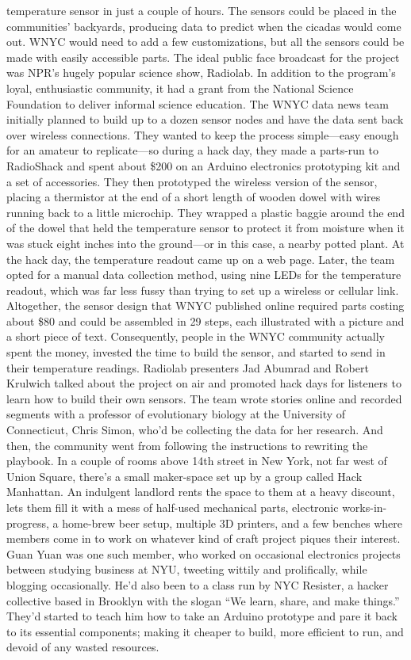temperature sensor in just a couple of hours. The sensors could be placed
in the communities' backyards, producing data to predict when the cicadas
would come out. WNYC would need to add a few customizations, but all
the sensors could be made with easily accessible parts.
The ideal public face broadcast for the project was NPR's hugely popular
science show, Radiolab. In addition to the program's loyal, enthusiastic
community, it had a grant from the National Science Foundation to deliver
informal science education.
The WNYC data news team initially planned to build up to a dozen sensor
nodes and have the data sent back over wireless connections. They wanted
to keep the process simple—easy enough for an amateur to replicate—so
during a hack day, they made a parts-run to RadioShack and spent about
\$200 on an Arduino electronics prototyping kit and a set of accessories.
They then prototyped the wireless version of the sensor, placing a thermistor
at the end of a short length of wooden dowel with wires running back
to a little microchip. They wrapped a plastic baggie around the end of the
dowel that held the temperature sensor to protect it from moisture when
it was stuck eight inches into the ground—or in this case, a nearby potted
plant. At the hack day, the temperature readout came up on a web page.
Later, the team opted for a manual data collection method, using nine LEDs
for the temperature readout, which was far less fussy than trying to set up a
wireless or cellular link.
Altogether, the sensor design that WNYC published online required parts
costing about \$80 and could be assembled in 29 steps, each illustrated with
a picture and a short piece of text. Consequently, people in the WNYC
community actually spent the money, invested the time to build the sensor,
and started to send in their temperature readings. Radiolab presenters
Jad Abumrad and Robert Krulwich talked about the project on air and
promoted hack days for listeners to learn how to build their own sensors.
The team wrote stories online and recorded segments with a professor of
evolutionary biology at the University of Connecticut, Chris Simon, who'd
be collecting the data for her research.
And then, the community went from following the instructions to rewriting
the playbook. In a couple of rooms above 14th street in New York, not
far west of Union Square, there's a small maker-space set up by a group
called Hack Manhattan. An indulgent landlord rents the space to them at a
heavy discount, lets them fill it with a mess of half-used mechanical parts,
electronic works-in-progress, a home-brew beer setup, multiple 3D printers,
and a few benches where members come in to work on whatever kind
of craft project piques their interest. Guan Yuan was one such member,
who worked on occasional electronics projects between studying business
at NYU, tweeting wittily and prolifically, while blogging occasionally.
He'd also been to a class run by NYC Resister, a hacker collective based
in Brooklyn with the slogan ``We learn, share, and make things.'' They'd
started to teach him how to take an Arduino prototype and pare it back to
its essential components; making it cheaper to build, more efficient to run,
and devoid of any wasted resources.

